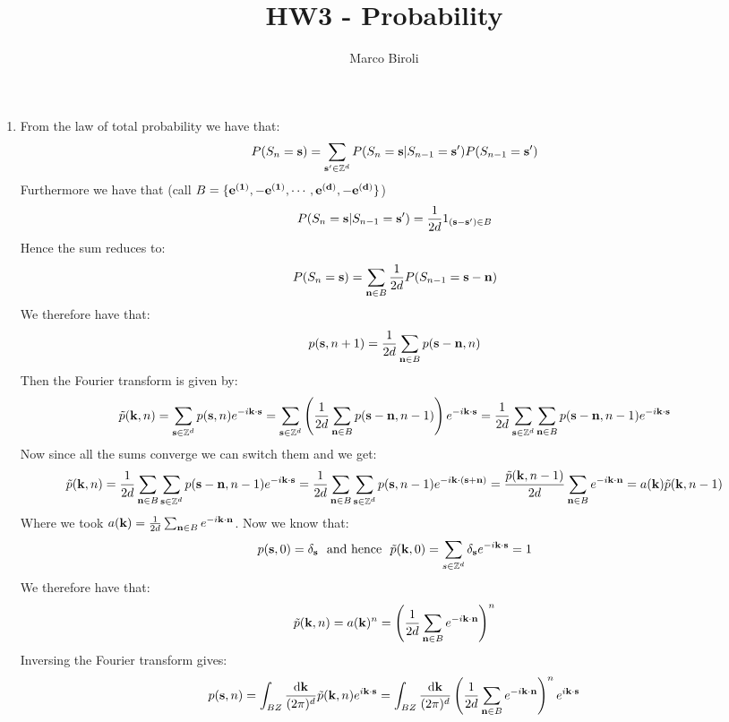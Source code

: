 \documentclass[10pt,a4paper]{article}
\author{Marco Biroli}
\title{HW3 - Probability}
\begin{document}
\maketitle

\begin{enumerate}

\item From the law of total probability we have that:
\[
P(S_n = \vb{s}) = \sum_{\vb{s}' \in \mathbb{Z}^d} P(S_n = \vb{s} | S_{n - 1} = \vb{s}') P(S_{n - 1} = \vb{s}')
\]
Furthermore we have that (call $B = \{\vb{e^{(1)}}, -\vb{e^{(1)}}, \cdots, \vb{e^{(d)}}, -\vb{e^{(d)}}\}$)
\[
P(S_n = \vb{s} | S_{n - 1} = \vb{s}') = \frac{1}{2d} 1_{(\vb{s} - \vb{s}') \in B}
\]
Hence the sum reduces to:
\[
P(S_n = \vb{s}) = \sum_{\vb{n} \in B} \frac{1}{2d} P(S_{n - 1} = \vb{s} - \vb{n})
\]
We therefore have that:
\[
p( \vb{s}, n+1) = \frac{1}{2d}\sum_{\vb{n} \in B} p(\vb{s} - \vb{n}, n)
\]
Then the Fourier transform is given by:
\[
\tilde{p}(\vb{k}, n) = \sum_{\vb{s} \in \mathbb{Z}^d} p(\vb{s}, n) e^{- i \vb{k} \cdot \vb{s}} = \sum_{\vb{s} \in \mathbb{Z}^d} \left( \frac{1}{2d} \sum_{\vb{n} \in B} p(\vb{s} - \vb{n}, n - 1) \right) e^{- i \vb{k} \cdot \vb{s}} = \frac{1}{2d} \sum_{\vb{s} \in \mathbb{Z}^d} \sum_{\vb{n} \in B} p(\vb{s} - \vb{n}, n-1) e^{-i \vb{k}\cdot \vb{s}}
\]
Now since all the sums converge we can switch them and we get:
\[
\tilde{p}(\vb{k}, n) = \frac{1}{2d} \sum_{\vb{n} \in B} \sum_{\vb{s} \in \mathbb{Z}^d} p(\vb{s} - \vb{n}, n-1) e^{-i \vb{k}\cdot \vb{s}} = \frac{1}{2d} \sum_{\vb{n} \in B} \sum_{\vb{s} \in \mathbb{Z}^d} p(\vb{s}, n-1) e^{-i \vb{k}\cdot(\vb{s} + \vb{n})} = \frac{ \tilde{p}(\vb{k}, n - 1) }{2d} \sum_{\vb{n} \in B} e^{- i \vb{k} \cdot \vb{n}} = a(\vb{k}) \tilde{p}(\vb{k}, n-1)
\]
Where we took $a(\vb{k}) = \frac{1}{2d} \sum_{\vb{n} \in B} e^{- i \vb{k} \cdot \vb{n}}$. Now we know that:
\[
p(\vb{s}, 0) = \delta_{\vb{s}} \mbox{~~and hence~~} \tilde{p}(\vb{k}, 0) = \sum_{s \in \mathbb{Z}^d} \delta_{\vb{s}} e^{- i \vb{k} \cdot \vb{s}} = 1 
\]
We therefore have that:
\[
\tilde{p}(\vb{k}, n) = a(\vb{k})^n = \left(\frac{1}{2d} \sum_{\vb{n} \in B} e^{- i \vb{k} \cdot \vb{n} }\right)^n
\]
Inversing the Fourier transform gives:
\[
p(\vb{s}, n) = \int_{BZ} \frac{\dd \vb{k}}{(2 \pi)^d} \tilde{p}(\vb{k}, n) e^{i \vb{k} \cdot \vb{s}} = \int_{BZ} \frac{\dd \vb{k}}{(2 \pi)^d} \left(\frac{1}{2d} \sum_{\vb{n} \in B} e^{- i \vb{k} \cdot \vb{n} }\right)^n e^{i \vb{k} \cdot \vb{s}}
\]


\end{enumerate}
\end{document}
